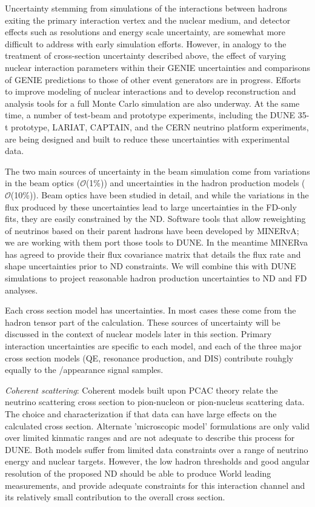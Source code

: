Uncertainty stemming from simulations of the interactions between hadrons
exiting the primary interaction vertex and the nuclear medium, and detector effects
such as resolutions and energy scale uncertainty, are somewhat more difficult to address with early
simulation efforts. However, in analogy to the treatment of cross-section uncertainty described above,
the effect of varying nuclear interaction parameters within their GENIE
uncertainties and comparisons of GENIE predictions to those of other
event generators are in progress.
Efforts to improve modeling of nuclear interactions and to develop 
reconstruction and analysis tools for a full Monte Carlo simulation are also underway. 
At the same time,
a number of test-beam and prototype experiments, including the DUNE 35-t prototype,
LARIAT, CAPTAIN, and the CERN neutrino platform experiments, are being designed and built to reduce these
uncertainties with experimental data.

The two main sources of uncertainty in the beam simulation come from variations in the beam optics
($\mathcal{O}$(1\%)) and uncertainties in the hadron production models ($\mathcal{O}$(10\%)).
Beam optics have been studied in detail, and while the variations in the flux produced by these uncertainties
lead to large uncertainties in the FD-only fits, they are easily constrained by the ND. Software tools that
allow reweighting of neutrinos based on their parent hadrons have been developed by MINERvA; we are working with
them port those tools to DUNE. In the meantime MINERva has agreed to provide their flux covariance matrix
that details the flux rate and shape uncertainties prior to ND constraints. We will combine this with DUNE
simulations to project reasonable hadron production uncertainties to ND and FD analyses.

Each cross section model has uncertainties. In most cases these come from the hadron tensor part of the
calculation. These sources of uncertainty will be discussed in the context of nuclear models later in this
section. Primary interaction uncertainties are specific to each model, and each of the three major cross 
section models (QE, resonance production, and DIS) contribute rouhgly equally to the \nue/\anue appearance signal samples.

  \emph{Coherent scattering}: Coherent models built upon PCAC theory relate the neutrino scattering 
  cross section to pion-nucleon or pion-nucleus scattering data. The choice and characterization
  if that data can have large effects on the calculated cross section. Alternate 'microscopic model' 
  formulations are only valid over limited kinmatic ranges and are not adequate to describe this process 
  for DUNE. Both models suffer from limited data constraints over a range of neutrino energy and nuclear targets.
  However, the low hadron thresholds and good angular resolution of the proposed ND should be able
  to produce World leading measurements, and provide adequate constraints for this interaction channel and 
  its relatively small contribution to the overall cross section.


